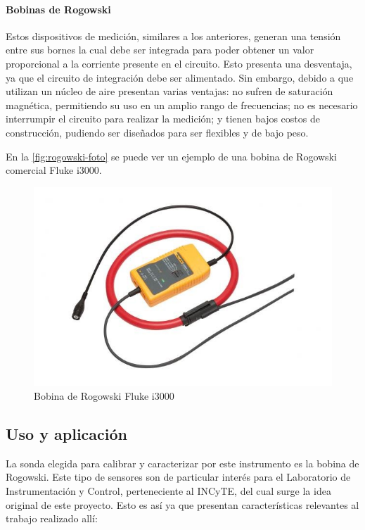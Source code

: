 \documentclass[../informe.tex]{subfiles}
\begin{document}
    \paragraph{Bobinas de Rogowski}
    Estos dispositivos de medición, similares a los anteriores, generan una tensión entre sus bornes la cual debe ser integrada para poder obtener un valor proporcional a la corriente presente en el circuito. Esto presenta una desventaja, ya que el circuito de integración debe ser alimentado. Sin embargo, debido a que utilizan un núcleo de aire presentan varias ventajas: no sufren de saturación magnética, permitiendo su uso en un amplio rango de frecuencias; no es necesario interrumpir el circuito para realizar la medición; y tienen bajos costos de construcción, pudiendo ser diseñados para ser flexibles y de bajo peso.

    En la \autoref{fig:rogowski-foto} se puede ver un ejemplo de una bobina de Rogowski comercial Fluke i3000.

        \begin{figure}[!htbp]
            \centering
            \includegraphics[scale=0.6]{images/rogowski-foto.jpg}
            \caption{Bobina de Rogowski Fluke i3000}
            \label{fig:rogowski-foto}
        \end{figure}

\subsection{Uso y aplicación}
La sonda elegida para calibrar y caracterizar por este instrumento es la bobina de Rogowski. Este tipo de sensores son de particular interés para el Laboratorio de Instrumentación y Control, perteneciente al INCyTE, del cual surge la idea original de este proyecto. Esto es así ya que presentan características relevantes al trabajo realizado allí:
\end{document}

